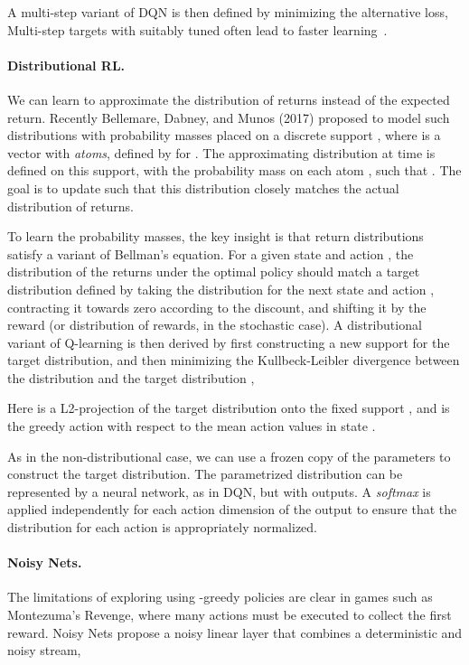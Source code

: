 \documentclass[letterpaper]{article} \usepackage{aaai18}  \usepackage{times}  \usepackage{helvet}  \usepackage{courier}  \usepackage{url}  \usepackage{graphicx}  \usepackage{amsmath,amssymb}
\begin{document}
A multi-step variant of DQN is then defined by minimizing the alternative loss, 
  \noindent Multi-step targets with suitably tuned  often lead to faster learning~\cite{Sutton:1998book}.


\paragraph{Distributional RL.}
We can learn to approximate the distribution of returns instead of the expected return.  Recently Bellemare, Dabney, and Munos (2017)\nocite{Bellemare2017ADP} proposed to model such distributions with probability masses placed on a discrete support , where  is a vector with  \emph{atoms}, defined by  for .  The approximating distribution  at time  is defined on this support, with the probability mass  on each atom , such that .  The goal is to update  such that this distribution closely matches the actual distribution of returns.

To learn the probability masses, the key insight is that return distributions satisfy a variant of Bellman's equation. For a given state  and action , the distribution of the returns under the optimal policy  should match a target distribution defined by taking the distribution for the next state  and action , contracting it towards zero according to the discount, and shifting it by the reward (or distribution of rewards, in the stochastic case).  A distributional variant of Q-learning is then derived by first constructing a new support for the target distribution, and then minimizing the Kullbeck-Leibler divergence between the distribution  and the target distribution ,

Here  is a L2-projection of the target distribution onto the fixed support , and  is the greedy action with respect to the mean action values  in state .

As in the non-distributional case, we can use a frozen copy of the parameters  to construct the target distribution. The parametrized distribution can be represented by a neural network, as in DQN, but with  outputs. A \textit{softmax} is applied independently for each action dimension of the output to ensure that the distribution for each action is appropriately normalized.

\paragraph{Noisy Nets.}
The limitations of exploring using -greedy policies are clear in games such as Montezuma's Revenge, where many actions must be executed to collect the first reward. Noisy Nets \cite{FortunatoAPMOGM17} propose a noisy linear layer that combines a deterministic and noisy stream,
\end{document}
